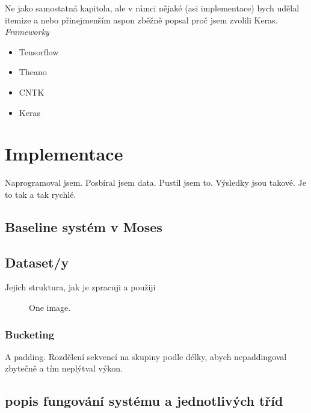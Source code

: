 Ne jako samostatná kapitola, ale v rámci nějaké (asi implementace) bych udělal itemize a nebo přinejmenším aspon zběžně popsal proč jsem zvolili Keras.
\emph{Frameworky}
\begin{itemize}
  \item Tensorflow
  \item Theano
  \item CNTK
  \item Keras
\end{itemize}


\chapter{Implementace}
Naprogramoval jsem.
Posbíral jsem data.
Pustil jsem to.
Výsledky jsou takové.
Je to tak a tak rychlé.

\section{Baseline systém v Moses}

\section{Dataset/y}
Jejich struktura, jak je zpracuji a použiji
\begin{figure}
    \begin{center}
    \end{center}
	\caption{One image. }
	\label{img:TODO}
\end{figure}


\subsection{Bucketing}
A padding. Rozdělení sekvencí na skupiny podle délky, abych nepaddingoval zbytečně a tím neplýtval výkon.

\section{popis fungování systému a jednotlivých tříd}

